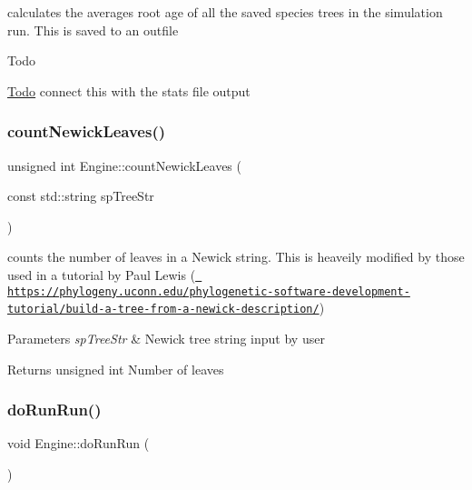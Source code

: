 calculates the averages root age of all the saved species trees in the simulation run. This is saved to an outfile 

\begin{DoxyRefDesc}{Todo}
\item[\mbox{\hyperlink{todo__todo000001}{Todo}}]connect this with the stats file output \end{DoxyRefDesc}
\mbox{\label{class_engine_ad3629de6e2e7b9f0c60c19cc38d9afee}} 
\subsubsection{\texorpdfstring{countNewickLeaves()}{countNewickLeaves()}}
{\footnotesize\ttfamily unsigned int Engine\+::count\+Newick\+Leaves (\begin{DoxyParamCaption}\item[{const std\+::string}]{sp\+Tree\+Str }\end{DoxyParamCaption})}



counts the number of leaves in a Newick string. This is heaveily modified by those used in a tutorial by Paul Lewis (\href{https://phylogeny.uconn.edu/phylogenetic-software-development-tutorial/build-a-tree-from-a-newick-description/}{\texttt{ https\+://phylogeny.\+uconn.\+edu/phylogenetic-\/software-\/development-\/tutorial/build-\/a-\/tree-\/from-\/a-\/newick-\/description/}}) 


\begin{DoxyParams}{Parameters}
{\em sp\+Tree\+Str} & Newick tree string input by user \\
\hline
\end{DoxyParams}
\begin{DoxyReturn}{Returns}
unsigned int Number of leaves 
\end{DoxyReturn}
\mbox{\label{class_engine_a667304a3ace7fdeed09186f1fa35794b}} 
\subsubsection{\texorpdfstring{doRunRun()}{doRunRun()}}
{\footnotesize\ttfamily void Engine\+::do\+Run\+Run (\begin{DoxyParamCaption}{ }\end{DoxyParamCaption})}



